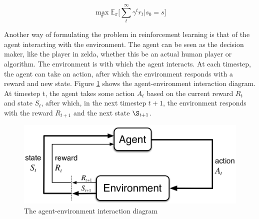 \documentclass[12pt,a4paper]{article}
\begin{document}
\begin{multicols}{2}
\begin{equation}
\underset{\pi}{\max} \mathbb{E}_{\pi} \bigg[\sum_{t}^{\infty} \gamma^t r_{t} | s_{0} = s \bigg]
\label{eq:rl-goal}
\end{equation}

Another way of formulating the problem in reinforcement learning is that of the agent interacting with the environment. The agent can be seen as the decision maker, like the player in zelda, whether this be an actual human player or algorithm. The environment is with which the agent interacts. At each timestep, the agent can take an action, after which the environment responds with a reward and new state. Figure \ref{fig:agent-env} shows the agent-environment interaction diagram. At timestep t, the agent takes some action $A_t$ based on the current reward $R_t$ and state $S_t$, after which, in the next timestep $t+1$, the environment responds with the reward $R_{t+1}$ and the next state $\S_{t+1}$. 

\begin{figure}[H]
    \centering
    \includegraphics[width=\linewidth]{agent-environment.png}
    \caption{The agent-environment interaction diagram \cite{sutton1998reinforcement}}
\label{fig:agent-env}
\end{figure}


\end{multicols}
\end{document}

